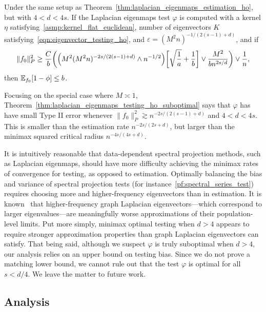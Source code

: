 \begin{theorem}
	\label{thm:laplacian_eigenmaps_testing_ho_suboptimal}
	Under the same setup as Theorem~\ref{thm:laplacian_eigenmaps_estimation_ho}, but with $4 < d < 4s$. If the Laplacian eigenmaps test $\varphi$ is computed with a kernel $\eta$ satisfying~\ref{asmp:kernel_flat_euclidean}, number of eigenvectors $K$ satisfying~\eqref{eqn:eigenvector_testing_ho}, and $\varepsilon = (M^2n)^{-1/(2(s - 1) + d)}$, and if 
	\begin{equation}
	\label{eqn:laplacian_eigenmaps_testing_criticalradius_ho_suboptimal}
	\|f_0\|_P^2 \geq \frac{C}{b}\biggl(\Bigl(M^2(M^2n)^{-2s/(2(s - 1) + d) } \wedge n^{-1/2}\Bigr)\biggl[\sqrt{\frac{1}{a}} + \frac{1}{b}\biggr] \vee \frac{M^2}{b n^{2s/d}} \biggr) \vee \frac{1}{n},
	\end{equation}
	then $\mathbb{E}_{f_0}[1 - \phi] \leq b$.
\end{theorem}
Focusing on the special case where $M \asymp 1$, Theorem~\ref{thm:laplacian_eigenmaps_testing_ho_suboptimal} says that $\varphi$ has have small Type II error whenever $\|f_0\|_P^2 \gtrsim n^{-2s/(2(s - 1) + d)}$ and $4 < d < 4s$. This is smaller than the estimation rate $n^{-2s/(2s + d)}$, but larger than the minimax squared critical radius $n^{-4s/(4s + d)}$. 

It is intuitively reasonable that data-dependent spectral projection methods, such as Laplacian eigenmaps, should have more difficulty achieving the minimax rates of convergence for testing, as opposed to estimation. Optimally balancing the bias and variance of spectral projection tests (for instance~\eqref{pf:spectral_series_test}) requires choosing more and higher-frequency eigenvectors than in estimation. It is known~\citep{trillos2019} that higher-frequency graph Laplacian eigenvectors---which correspond to larger eigenvalues---are meaningfully worse approximations of their population-level limits. Put more simply, minimax optimal testing when $d > 4$ appears to require stronger approximation properties than graph Laplacian eigenvectors can satisfy.  That being said, although we suspect $\varphi$ is truly suboptimal when $d > 4$, our analysis relies on an upper bound on testing bias. Since we do not prove a matching lower bound, we cannot rule out that the test $\varphi$ is optimal for all $s < d/4$. We leave the matter to future work.

\subsection{Analysis}
\label{subsec:analysis}


